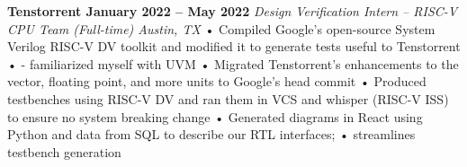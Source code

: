 \documentclass[../main.tex]{subfiles}
\begin{document}
%
\noindent\textbf{{\fontsize{\textFontSize}{\textFontBox}\selectfont Tenstorrent \hfill January 2022 – May 2022}}
\vspace{1mm}\newline
%
{\fontsize{\textFontSize}{\textFontBox}\selectfont\emph{Design Verification Intern – RISC-V CPU Team (Full-time) \hfill Austin, TX \hspace{0 cm}}}
\vspace{0mm}\newline
{\fontsize{\textFontSize}{\textFontBox}\selectfont • Compiled Google’s open-source System Verilog RISC-V DV toolkit and modified it to generate tests useful to Tenstorrent }\newline
{\fontsize{\textFontSize}{\textFontBox}\selectfont • - familiarized myself with UVM }\newline
{\fontsize{\textFontSize}{\textFontBox}\selectfont • Migrated Tenstorrent’s enhancements to the vector, floating point, and more units to Google’s head commit }\newline
{\fontsize{\textFontSize}{\textFontBox}\selectfont • Produced testbenches using RISC-V DV and ran them in VCS and whisper (RISC-V ISS) to ensure no system breaking change }\newline
{\fontsize{\textFontSize}{\textFontBox}\selectfont • Generated diagrams in React using Python and data from SQL to describe our RTL interfaces; }\newline
{\fontsize{\textFontSize}{\textFontBox}\selectfont • streamlines testbench generation }\newline
%
%
%
%
%
\end{document}
